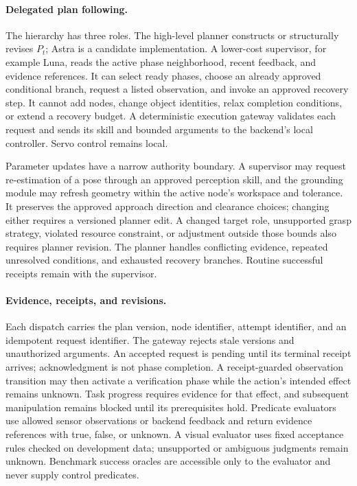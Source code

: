 \documentclass[10pt,twocolumn,letterpaper]{article}
\begin{document}
\paragraph{Delegated plan following.}
The hierarchy has three roles. The high-level planner constructs or structurally revises $P_t$; Astra is a candidate implementation. A lower-cost supervisor, for example Luna, reads the active phase neighborhood, recent feedback, and evidence references. It can select ready phases, choose an already approved conditional branch, request a listed observation, and invoke an approved recovery step. It cannot add nodes, change object identities, relax completion conditions, or extend a recovery budget. A deterministic execution gateway validates each request and sends its skill and bounded arguments to the backend's local controller. Servo control remains local.

Parameter updates have a narrow authority boundary. A supervisor may request re-estimation of a pose through an approved perception skill, and the grounding module may refresh geometry within the active node's workspace and tolerance. It preserves the approved approach direction and clearance choices; changing either requires a versioned planner edit. A changed target role, unsupported grasp strategy, violated resource constraint, or adjustment outside those bounds also requires planner revision. The planner handles conflicting evidence, repeated unresolved conditions, and exhausted recovery branches. Routine successful receipts remain with the supervisor.

\paragraph{Evidence, receipts, and revisions.}
Each dispatch carries the plan version, node identifier, attempt identifier, and an idempotent request identifier. The gateway rejects stale versions and unauthorized arguments. An accepted request is pending until its terminal receipt arrives; acknowledgment is not phase completion. A receipt-guarded observation transition may then activate a verification phase while the action's intended effect remains unknown. Task progress requires evidence for that effect, and subsequent manipulation remains blocked until its prerequisites hold. Predicate evaluators use allowed sensor observations or backend feedback and return evidence references with true, false, or unknown. A visual evaluator uses fixed acceptance rules checked on development data; unsupported or ambiguous judgments remain unknown. Benchmark success oracles are accessible only to the evaluator and never supply control predicates.
\end{document}

